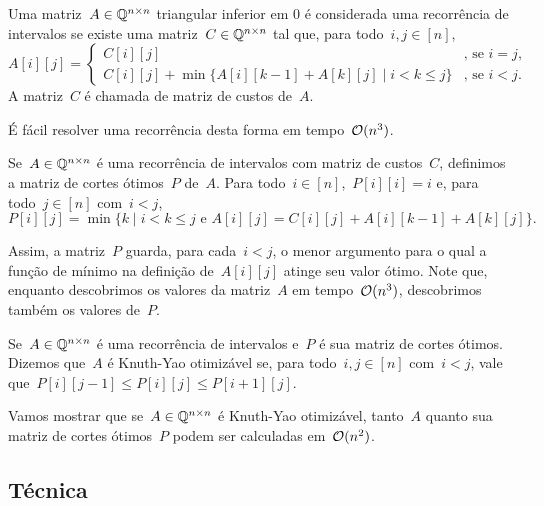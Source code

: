 \begin{defi} \label{ KY:recint }
Uma matriz~$A \in \mathbb{Q}^{n \times n}$ triangular inferior em 0 é considerada uma recorrência de intervalos se existe uma matriz~$C \in \mathbb{Q}^{n \times n}$ tal que, para todo~$i,j \in [n]$,
\begin{equation*}
A[i][j] = \begin{cases}
C[i][j]                                                           & \text{, se } i = j \text{, }  \\
C[i][j] + \min\{A[i][k-1] + A[k][j] \mid i < k \leq j \}          & \text{, se } i < j \text{.}
\end{cases}
\end{equation*}
A matriz~$C$ é chamada de matriz de custos de~$A$.
\end{defi}

É fácil resolver uma recorrência desta forma em tempo~$\mathcal{O}(n^3)$. 

\begin{defi}
Se~$A \in \mathbb{Q}^{n \times n}$ é uma recorrência de intervalos com matriz de custos~$C$, definimos a matriz de cortes ótimos~$P$ de~$A$. Para todo~$i \in [n]$,~$P[i][i] = i$ e, para todo~$j \in [n]$ com~$i < j$, 
$$P[i][j] = \min\{k \mid i < k \leq j \text{ e } A[i][j] = C[i][j] + A[i][k-1] + A[k][j]\} \text{.}$$
\end{defi}

Assim, a matriz~$P$ guarda, para cada~$i < j$, o menor argumento para o qual a função de mínimo na definição de~$A[i][j]$ atinge seu valor ótimo. Note que, enquanto descobrimos os valores da matriz~$A$ em tempo~$\mathcal{O}(n^3)$, descobrimos também os valores de~$P$.

\begin{defi}
Se~$A \in \mathbb{Q}^{n \times n}$ é uma recorrência de intervalos e~$P$ é sua matriz de cortes ótimos. Dizemos que~$A$ é Knuth-Yao otimizável se, para todo~$i,j \in [n]$ com~$i < j$, vale que~${P[i][j-1] \leq P[i][j] \leq P[i+1][j]}$.
\end{defi}

Vamos mostrar que se~$A \in \mathbb{Q}^{n \times n}$ é Knuth-Yao otimizável, tanto~$A$ quanto sua matriz de cortes ótimos~$P$ podem ser calculadas em~$\mathcal{O}(n^2)$.


\subsection{Técnica}

